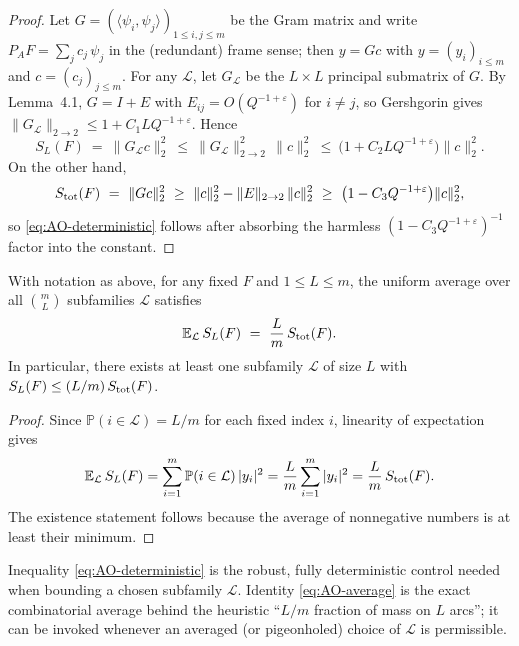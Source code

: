 \begin{proof}
Let $G=(\langle\psi_i,\psi_j\rangle)_{1\le i,j\le m}$ be the Gram matrix and write $P_AF=\sum_{j} c_j\,\psi_j$ in the (redundant) frame sense; then $y=Gc$ with $y=(y_i)_{i\le m}$ and $c=(c_j)_{j\le m}$. 
For any $\mathcal L$, let $G_{\mathcal L}$ be the $L\times L$ principal submatrix of $G$. By Lemma~4.1, $G=I+E$ with $E_{ij}=O(Q^{-1+\varepsilon})$ for $i\ne j$, so Gershgorin gives $\|G_{\mathcal L}\|_{2\to2}\le 1+C_1LQ^{-1+\varepsilon}$. Hence
\[
S_L(F)\ =\ \|G_{\mathcal L}c\|_2^2\ \le\ \|G_{\mathcal L}\|_{2\to2}^2\,\|c\|_2^2\ \le\ \bigl(1+C_2LQ^{-1+\varepsilon}\bigr)\|c\|_2^2.
\]
On the other hand,
\[
S_{\rm tot}(F)\ =\ \|Gc\|_2^2\ \ge\ \|c\|_2^2 - \|E\|_{2\to2}\,\|c\|_2^2\ \ge\ \bigl(1-C_3Q^{-1+\varepsilon}\bigr)\|c\|_2^2,
\]
so \eqref{eq:AO-deterministic} follows after absorbing the harmless $(1-C_3Q^{-1+\varepsilon})^{-1}$ factor into the constant.
\end{proof}

\begin{corollary}\label{cor:AO-average}
With notation as above, for any fixed $F$ and $1\le L\le m$, the uniform average over all $\binom{m}{L}$ subfamilies $\mathcal L$ satisfies
\begin{equation}\label{eq:AO-average}
\mathbb E_{\mathcal L}\, S_L(F)\ =\ \frac{L}{m}\,S_{\rm tot}(F).
\end{equation}
In particular, there exists at least one subfamily $\mathcal L$ of size $L$ with $S_L(F)\le (L/m)\,S_{\rm tot}(F)$.
\end{corollary}

\begin{proof}
Since $\mathbb P(i\in\mathcal L)=L/m$ for each fixed index $i$, linearity of expectation gives
\[
\mathbb E_{\mathcal L}\,S_L(F)
=\sum_{i=1}^m \mathbb P(i\in\mathcal L)\,|y_i|^2
=\frac{L}{m}\sum_{i=1}^m |y_i|^2
=\frac{L}{m}\,S_{\rm tot}(F).
\]
The existence statement follows because the average of nonnegative numbers is at least their minimum.
\end{proof}

\begin{remark}
Inequality \eqref{eq:AO-deterministic} is the robust, fully deterministic control needed when bounding a chosen subfamily $\mathcal L$. 
Identity \eqref{eq:AO-average} is the exact combinatorial average behind the heuristic “$L/m$ fraction of mass on $L$ arcs”; it can be invoked whenever an averaged (or pigeonholed) choice of $\mathcal L$ is permissible.
\end{remark}

